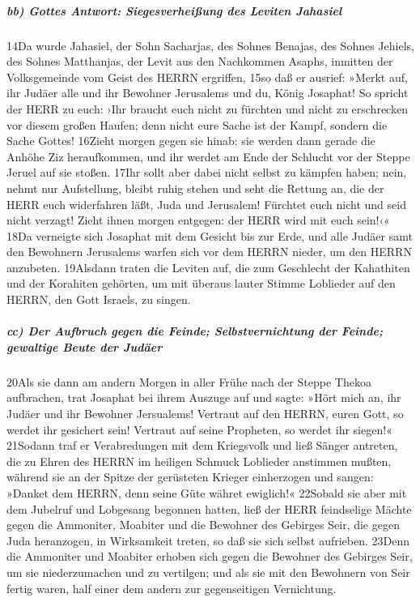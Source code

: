 \hypertarget{bb-gottes-antwort-siegesverheiuxdfung-des-leviten-jahasiel}{%
\subparagraph{bb) Gottes Antwort: Siegesverheißung des Leviten
Jahasiel}\label{bb-gottes-antwort-siegesverheiuxdfung-des-leviten-jahasiel}}

14Da wurde Jahasiel, der Sohn Sacharjas, des Sohnes Benajas, des Sohnes
Jehiels, des Sohnes Matthanjas, der Levit aus den Nachkommen Asaphs,
inmitten der Volksgemeinde vom Geist des HERRN ergriffen, 15so daß er
ausrief: »Merkt auf, ihr Judäer alle und ihr Bewohner Jerusalems und du,
König Josaphat! So spricht der HERR zu euch: ›Ihr braucht euch nicht zu
fürchten und nicht zu erschrecken vor diesem großen Haufen; denn nicht
eure Sache ist der Kampf, sondern die Sache Gottes! 16Zieht morgen gegen
sie hinab: sie werden dann gerade die Anhöhe Ziz heraufkommen, und ihr
werdet am Ende der Schlucht vor der Steppe Jeruel auf sie stoßen. 17Ihr
sollt aber dabei nicht selbst zu kämpfen haben; nein, nehmt nur
Aufstellung, bleibt ruhig stehen und seht die Rettung an, die der HERR
euch widerfahren läßt, Juda und Jerusalem! Fürchtet euch nicht und seid
nicht verzagt! Zieht ihnen morgen entgegen: der HERR wird mit euch
sein!‹« 18Da verneigte sich Josaphat mit dem Gesicht bis zur Erde, und
alle Judäer samt den Bewohnern Jerusalems warfen sich vor dem HERRN
nieder, um den HERRN anzubeten. 19Alsdann traten die Leviten auf, die
zum Geschlecht der Kahathiten und der Korahiten gehörten, um mit überaus
lauter Stimme Loblieder auf den HERRN, den Gott Israels, zu singen.

\hypertarget{cc-der-aufbruch-gegen-die-feinde-selbstvernichtung-der-feinde-gewaltige-beute-der-juduxe4er}{%
\subparagraph{cc) Der Aufbruch gegen die Feinde; Selbstvernichtung der
Feinde; gewaltige Beute der
Judäer}\label{cc-der-aufbruch-gegen-die-feinde-selbstvernichtung-der-feinde-gewaltige-beute-der-juduxe4er}}

20Als sie dann am andern Morgen in aller Frühe nach der Steppe Thekoa
aufbrachen, trat Josaphat bei ihrem Auszuge auf und sagte: »Hört mich
an, ihr Judäer und ihr Bewohner Jersualems! Vertraut auf den HERRN,
euren Gott, so werdet ihr gesichert sein! Vertraut auf seine Propheten,
so werdet ihr siegen!« 21Sodann traf er Verabredungen mit dem Kriegsvolk
und ließ Sänger antreten, die zu Ehren des HERRN im heiligen Schmuck
Loblieder anstimmen mußten, während sie an der Spitze der gerüsteten
Krieger einherzogen und sangen: »Danket dem HERRN, denn seine Güte
währet ewiglich!« 22Sobald sie aber mit dem Jubelruf und Lobgesang
begonnen hatten, ließ der HERR feindselige Mächte gegen die Ammoniter,
Moabiter und die Bewohner des Gebirges Seir, die gegen Juda heranzogen,
in Wirksamkeit treten, so daß sie sich selbst aufrieben. 23Denn die
Ammoniter und Moabiter erhoben sich gegen die Bewohner des Gebirges
Seir, um sie niederzumachen und zu vertilgen; und als sie mit den
Bewohnern von Seir fertig waren, half einer dem andern zur gegenseitigen
Vernichtung.

